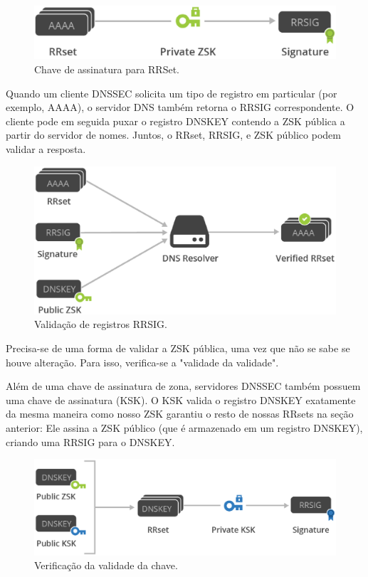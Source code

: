 \documentclass[12pt,openright,a4paper]{report}
\begin{document}
{\begin{figure}[h!]
	\centering
	\includegraphics[scale=0.4]{keys.eps}
	\caption{Chave de assinatura para RRSet.}
	\label{fig:keys}
\end{figure}

Quando um cliente DNSSEC solicita um tipo de registro em particular (por exemplo, AAAA), o servidor DNS também retorna o RRSIG correspondente. O cliente pode em seguida puxar o registro DNSKEY contendo a ZSK pública a partir do servidor de nomes. Juntos, o RRset, RRSIG, e ZSK público podem validar a resposta.

\begin{figure}[h!]
	\centering
	\includegraphics[scale=0.4]{validation.eps}
	\caption{Validação de registros RRSIG.}
	\label{fig:keys}
\end{figure}

Precisa-se de uma forma de validar a ZSK pública, uma vez que não se sabe se houve alteração. Para isso, verifica-se a "validade da validade". 

Além de uma chave de assinatura de zona, servidores DNSSEC também possuem uma chave de assinatura (KSK). O KSK valida o registro DNSKEY exatamente da mesma maneira como nosso ZSK garantiu o resto de nossas RRsets na seção anterior: Ele assina a ZSK público (que é armazenado em um registro DNSKEY), criando uma RRSIG para o DNSKEY.

\begin{figure}[h!]
	\centering
	\includegraphics[scale=0.4]{valid_validation.eps}
	\caption{Verificação da validade da chave.}
	\label{fig:keys}
\end{figure}

}
\end{document}
